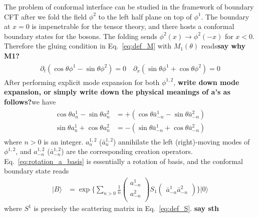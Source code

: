 The problem of conformal interface can be studied in the framework of boundary CFT\cite{cardy_boundary_2004,cardy_conformal_1984} after we fold the field $\phi^2$ to the left half plane on top of $\phi^1$\cite{oshikawa_boundary_2010}. The boundary at $x=0$ is impenetrable for the tensor theory, and there hosts a conformal boundary states for the bosons. The folding sends $\phi^2(x)\rightarrow\phi^2(-x)$ for $x<0$. Therefore the gluing condition in Eq.~\eqref{eq:def_M} with $M_1(\theta)$ reads{\bf\color{red}say why M1?}
\begin{eqnarray}\begin{aligned}
\partial_t(\cos\theta\phi^1-\sin\theta\phi^2)=0 \quad
\partial_x(\sin\theta\phi^1+\cos\theta\phi^2)=0 
\end{aligned}\end{eqnarray}
After performing explicit mode expansion for both $\phi^{1,2}$, {\bf\color{red}write down mode expansion, or simply write down the physical meanings of a's as follows?}we have
\begin{eqnarray}\begin{aligned}
\label{eq:rotation_a_basis}
\cos\theta a_n^1-\sin\theta a_n^2 &= +( \cos\theta\bar{a}_{-n}^1-\sin\theta \bar{a}_{-n}^2 ) \\
\sin\theta a_n^1+\cos\theta a_n^2 &= -( \sin\theta\bar{a}_{-n}^1+\cos\theta \bar{a}_{-n}^2 ) 
\end{aligned}\end{eqnarray}
where $n>0$ is an integer. $a_n^{1,2}$ ($\bar{a}_n^{1,2}$) annihilate the left (right)-moving modes of $\phi^{1,2}$, and $a_{-n}^{1,2}$ ($\bar{a}_{-n}^{1,2}$) are the corresponding creation operators. Eq.~\eqref{eq:rotation_a_basis} is essentially a rotation of basis, and the conformal boundary state reads\cite{oshikawa_boundary_2010}
\begin{equation}
\label{eq:bd_state}
\begin{aligned}
| B \rangle 
& =  \exp\Big\{ \sum_{n > 0 } \frac{1}{n}
\begin{pmatrix}
a_{-n}^1\\
a_{-n}^2\\                              
\end{pmatrix}
S_1
\begin{pmatrix}
\bar{a}_{-n}^1  \bar{a}_{-n}^2
\end{pmatrix} \Big\} |0\rangle
\end{aligned}
\end{equation}
where $S^1$ is precisely the scattering matrix in Eq.~\eqref{eq:def_S}.  {\bf\color{red}say sth}
